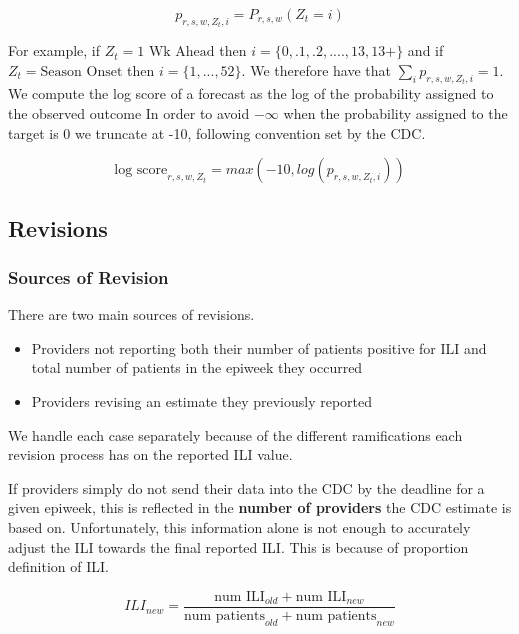 \documentclass{umassthesis}          %
\begin{document}
$$p_{r,s,w,Z_t,i} = P_{r,s,w}(Z_{t} =i)$$

For example, if $Z_t = \text{1 Wk Ahead}$ then $i = \{0,.1,.2,....,13,13+\}$ and if $Z_t = \text{Season Onset}$ then $i=\{1,...,52\}$. We therefore have that $\sum_i p_{r,s,w,Z_t,i} = 1$. We compute the log score of a forecast as the log of the probability assigned to the observed outcome In order to avoid $-\infty$ when the probability assigned to the target is $0$ we truncate at -10, following convention set by the CDC. 

\begin{equation}
\text{log score}_{r,s,w,Z_t} = max(-10,log( p_{r,s,w,Z_t,i}))
\end{equation}



\subsection{Revisions}
\subsubsection{Sources of Revision}

There are two main sources of revisions. 

\begin{itemize}
    \item Providers not reporting both their number of patients positive for ILI and total number of patients in the epiweek they occurred
    \item Providers revising an estimate they previously reported 
\end{itemize}

We handle each case separately because of the different ramifications each revision process has on the reported ILI value. 

If providers simply do not send their data into the CDC by the deadline for a given epiweek, this is reflected in the \textbf{number of providers} the CDC estimate is based on. Unfortunately, this information alone is not enough to accurately adjust the ILI towards the final reported ILI. This is because of proportion definition of ILI. 

\begin{equation}
    ILI_{new} = \frac{\text{num ILI}_{old} + \text{num ILI}_{new}} {\text{num patients}_{old} + \text{num patients}_{new}}
\end{equation}
\end{document}
